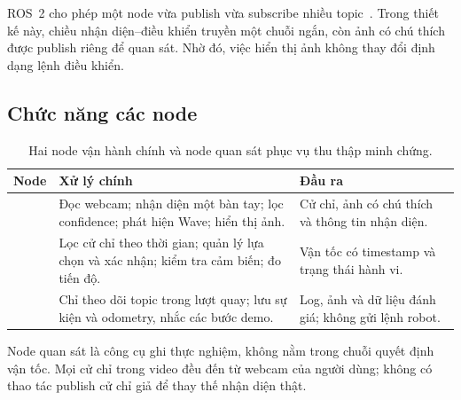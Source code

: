 \documentclass[12pt,a4paper]{article}
\newcommand{\smalltable}{\small\setlength{\tabcolsep}{4pt}\renewcommand{\arraystretch}{1.12}}
\begin{document}
ROS~2 cho phép một node vừa publish vừa subscribe nhiều topic~\cite{ros_topics}. Trong thiết kế này, chiều nhận diện--điều khiển truyền một chuỗi ngắn, còn ảnh có chú thích được publish riêng để quan sát. Nhờ đó, việc hiển thị ảnh không thay đổi định dạng lệnh điều khiển.

\subsection{Chức năng các node}
\begin{table}[!htbp]\centering\smalltable
\begin{tabularx}{\linewidth}{@{}p{4.1cm}LL@{}}\toprule
\textbf{Node} & \textbf{Xử lý chính} & \textbf{Đầu ra}\\\midrule
{} & Đọc webcam; nhận diện một bàn tay; lọc confidence; phát hiện Wave; hiển thị ảnh. & Cử chỉ, ảnh có chú thích và thông tin nhận diện.\\
 & Lọc cử chỉ theo thời gian; quản lý lựa chọn và xác nhận; kiểm tra cảm biến; đo tiến độ. & Vận tốc có timestamp và trạng thái hành vi.\\
 & Chỉ theo dõi topic trong lượt quay; lưu sự kiện và odometry, nhắc các bước demo. & Log, ảnh và dữ liệu đánh giá; không gửi lệnh robot.\\\bottomrule
\end{tabularx}
\caption{Hai node vận hành chính và node quan sát phục vụ thu thập minh chứng.}
\end{table}
Node quan sát là công cụ ghi thực nghiệm, không nằm trong chuỗi quyết định vận tốc. Mọi cử chỉ trong video đều đến từ webcam của người dùng; không có thao tác publish cử chỉ giả để thay thế nhận diện thật.
\end{document}
